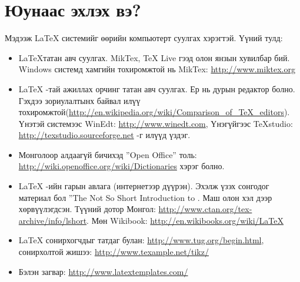 \chapter{Юунаас эхлэх вэ?}
\label{apdx:B}
Мэдээж \LaTeX{} системийг өөрийн компьютерт суулгах хэрэгтэй. Үүний тулд:
\begin{itemize}
	\item \LaTeX татан авч суулгах. MikTex, TeX Live гээд олон янзын хувилбар бий. Windows системд хамгийн тохиромжтой нь MikTex: \url{http://www.miktex.org}
	\item \LaTeX{} -тай ажиллах орчинг татан авч суулгах. Ер нь дурын редактор болно. Гэхдээ зориулалтынх байвал илүү тохиромжтой(\url{http://en.wikipedia.org/wiki/Comparison_of_TeX_editors}). Үнэтэй системээс WinEdt: \url{http://www.winedt.com}, Үнэгүйгээс TeXstudio: \url{http://texstudio.sourceforge.net} -г илүүд үздэг.
	\item Монголоор алдаагүй бичихэд ''Open Office'' толь: \url{http://wiki.openoffice.org/wiki/Dictionaries} хэрэг болно.
	\item \LaTeX{} -ийн гарын авлага (интернетээр дүүрэн). Эхэлж үзэх сонгодог материал бол ''The Not So Short Introduction to \LaTeXe. Маш олон хэл дээр хөрвүүлэгдсэн. Түүний дотор Монгол: \url{http://www.ctan.org/tex-archive/info/lshort}. Мөн Wikibook: \url{http://en.wikibooks.org/wiki/LaTeX}
	\item \LaTeX{} сонирхогчдыг татдаг булан: \url{http://www.tug.org/begin.html}, сонирхолтой жишээ: \url{http://www.texample.net/tikz/}
	\item Бэлэн загвар: \url{http://www.latextemplates.com/}
	 
\end{itemize}

